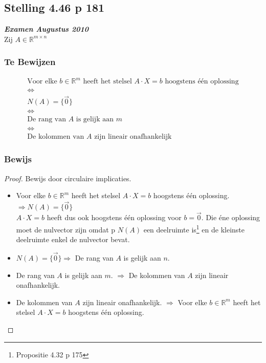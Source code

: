 \documentclass[lineaire_algebra_oplossingen.tex]{subfiles}
\begin{document}
\subsection{Stelling 4.46 p 181}
\label{4.46}
\textit{\textbf{Examen Augustus 2010}}\\
Zij $A \in \mathbb{R}^{m\times n}$

\subsubsection*{Te Bewijzen}
\begin{gather*}
\text{Voor elke $b \in \mathbb{R}^m$ heeft het stelsel $A\cdot X = b$ hoogstens \'e\'en oplossing} \\
\Leftrightarrow \\
N(A) = \{\vec{0}\} \\
\Leftrightarrow \\
\text{De rang van $A$ is gelijk aan $m$} \\
\Leftrightarrow \\
\text{De kolommen van $A$ zijn lineair onafhankelijk}
\end{gather*}

\subsubsection*{Bewijs}
\begin{proof}
Bewijs door circulaire implicaties.
\begin{itemize}
\item
Voor elke $b \in \mathbb{R}^m$ heeft het stelsel $A\cdot X = b$ hoogstens \'e\'en oplossing.
 $\Rightarrow N(A) = \{\vec{0}\}$\\
$A\cdot X = b$ heeft dus ook hoogstens \'e\'en oplossing voor $b = \vec{0}$. Die \'ene oplossing moet de nulvector zijn omdat  p $N(A)$ een deelruimte is\footnote{Propositie 4.32 p 175} en de kleinste deelruimte enkel de nulvector bevat.

\item
$N(A) = \{\vec{0}\} \Rightarrow $ De rang van $A$ is gelijk aan $n$.


\item
De rang van $A$ is gelijk aan $m$. $\Rightarrow$ De kolommen van $A$ zijn lineair onafhankelijk.


\item
De kolommen van $A$ zijn lineair onafhankelijk. $\Rightarrow$ Voor elke $b \in \mathbb{R}^m$ heeft het stelsel $A\cdot X = b$ hoogstens \'e\'en oplossing.

\end{itemize}
\end{proof}
\end{document}

